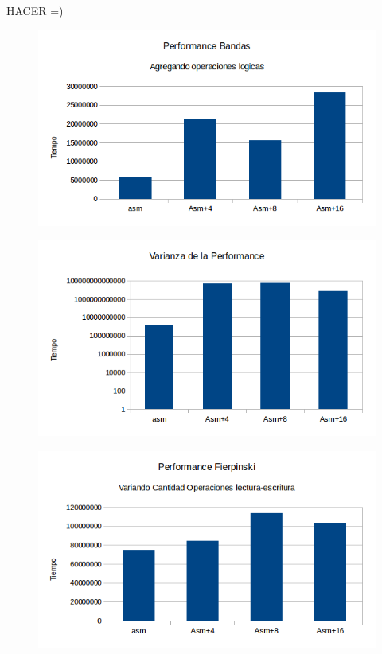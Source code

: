 \documentclass[a4paper]{article}
\begin{document}
HACER =)

\begin{figure}[h!]
  \begin{center}
  \includegraphics[scale=0.66]{Graficos1.5/ban/addsub/per.png}
  \label{nombreparareferenciar1}
  \end{center}
\end{figure}

\begin{figure}[h!]
  \begin{center}
  \includegraphics[scale=0.66]{Graficos1.5/ban/addsub/var.png}
  \label{nombreparareferenciar1}
  \end{center}
\end{figure}

\newpage
\begin{figure}[h!]
  \begin{center}
  \includegraphics[scale=0.66]{Graficos1.5/sie/pushpop/per.png}
  \label{nombreparareferenciar1}
  \end{center}
\end{figure}
\end{document}
